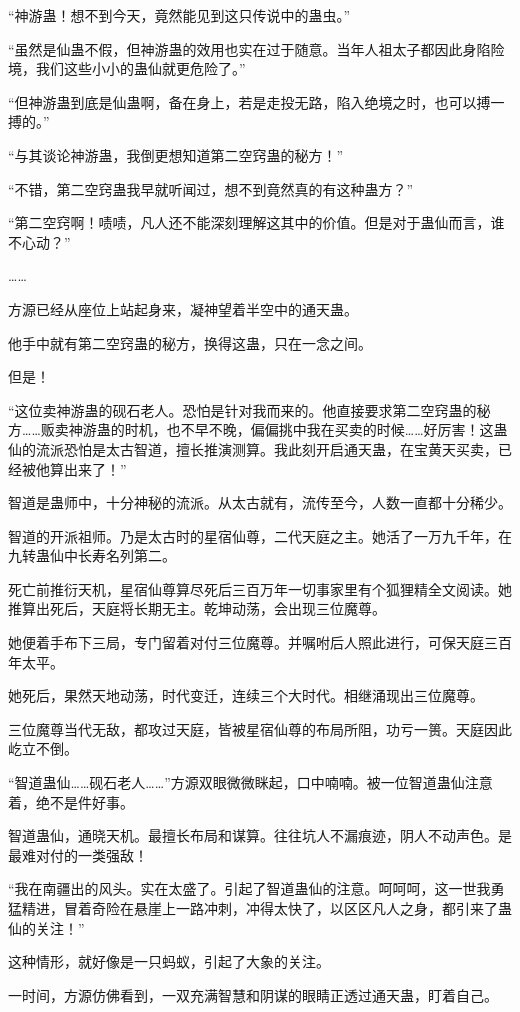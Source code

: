 \begin{this_body}
“神游蛊！想不到今天，竟然能见到这只传说中的蛊虫。”

“虽然是仙蛊不假，但神游蛊的效用也实在过于随意。当年人祖太子都因此身陷险境，我们这些小小的蛊仙就更危险了。”

“但神游蛊到底是仙蛊啊，备在身上，若是走投无路，陷入绝境之时，也可以搏一搏的。”

“与其谈论神游蛊，我倒更想知道第二空窍蛊的秘方！”

“不错，第二空窍蛊我早就听闻过，想不到竟然真的有这种蛊方？”

“第二空窍啊！啧啧，凡人还不能深刻理解这其中的价值。但是对于蛊仙而言，谁不心动？”

……

方源已经从座位上站起身来，凝神望着半空中的通天蛊。

他手中就有第二空窍蛊的秘方，换得这蛊，只在一念之间。

但是！

“这位卖神游蛊的砚石老人。恐怕是针对我而来的。他直接要求第二空窍蛊的秘方……贩卖神游蛊的时机，也不早不晚，偏偏挑中我在买卖的时候……好厉害！这蛊仙的流派恐怕是太古智道，擅长推演测算。我此刻开启通天蛊，在宝黄天买卖，已经被他算出来了！”

智道是蛊师中，十分神秘的流派。从太古就有，流传至今，人数一直都十分稀少。

智道的开派祖师。乃是太古时的星宿仙尊，二代天庭之主。她活了一万九千年，在九转蛊仙中长寿名列第二。

死亡前推衍天机，星宿仙尊算尽死后三百万年一切事家里有个狐狸精全文阅读。她推算出死后，天庭将长期无主。乾坤动荡，会出现三位魔尊。

她便着手布下三局，专门留着对付三位魔尊。并嘱咐后人照此进行，可保天庭三百年太平。

她死后，果然天地动荡，时代变迁，连续三个大时代。相继涌现出三位魔尊。

三位魔尊当代无敌，都攻过天庭，皆被星宿仙尊的布局所阻，功亏一篑。天庭因此屹立不倒。

“智道蛊仙……砚石老人……”方源双眼微微眯起，口中喃喃。被一位智道蛊仙注意着，绝不是件好事。

智道蛊仙，通晓天机。最擅长布局和谋算。往往坑人不漏痕迹，阴人不动声色。是最难对付的一类强敌！

“我在南疆出的风头。实在太盛了。引起了智道蛊仙的注意。呵呵呵，这一世我勇猛精进，冒着奇险在悬崖上一路冲刺，冲得太快了，以区区凡人之身，都引来了蛊仙的关注！”

这种情形，就好像是一只蚂蚁，引起了大象的关注。

一时间，方源仿佛看到，一双充满智慧和阴谋的眼睛正透过通天蛊，盯着自己。


\end{this_body}
